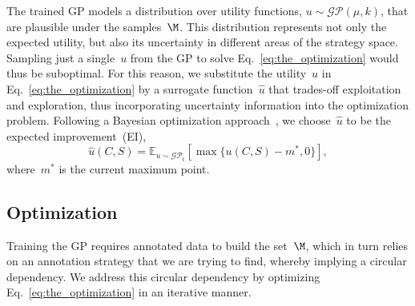 The trained GP models a distribution over utility functions, $u \sim\mathcal{GP}(\mu, k)$, that are plausible under the samples~$\M$. This distribution represents not only the expected utility, but also its uncertainty in different areas of the strategy space. Sampling just a single~$u$ from the GP to solve Eq.~\eqref{eq:the_optimization} would thus be suboptimal. For this reason, we substitute the utility~$u$ in Eq.~\eqref{eq:the_optimization} by a surrogate function~$\hat{u}$ that trades-off exploitation and exploration, thus incorporating uncertainty information into the optimization problem. Following a Bayesian optimization approach~, we choose~$\hat{u}$ to be the expected improvement~(EI),
\begin{equation}
    \hat{u}(C, S) = \mathbb{E}_{u\sim\mathcal{GP}_t}[\max\{u(C, S) - m^*, 0\}],
    \label{eq:EI}
\end{equation}
where~$m^*$ is the current maximum point.

\subsection{Optimization}

Training the GP requires annotated data to build the set~$\M$, which in turn relies on an annotation strategy that we are trying to find, whereby implying a circular dependency. We address this circular dependency by optimizing Eq.~\eqref{eq:the_optimization} in an iterative manner.

